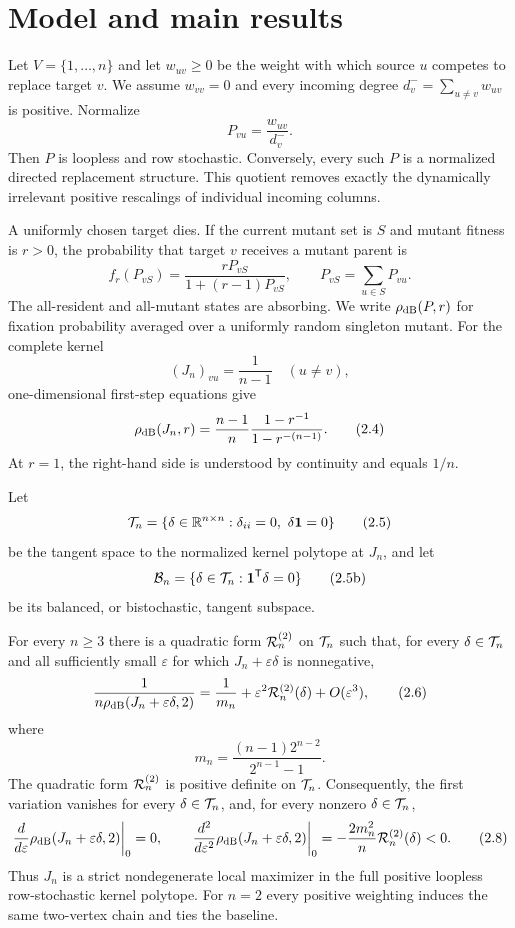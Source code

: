 \section{Model and main results}\label{sec:model-results}

Let $V=\{1,\ldots,n\}$ and let $w_{uv}\ge0$ be the weight with which source
$u$ competes to replace target $v$.  We assume $w_{vv}=0$ and every incoming
degree $d_v^-=\sum_{u\ne v}w_{uv}$ is positive.  Normalize
\[
 P_{vu}=\frac{w_{uv}}{d_v^-}.                              \tag{2.1}\label{2.1}
\]
Then $P$ is loopless and row stochastic.  Conversely, every such $P$ is a
normalized directed replacement structure.  This quotient removes exactly
the dynamically irrelevant positive rescalings of individual incoming
columns.

A uniformly chosen target dies.  If the current mutant set is $S$ and mutant
fitness is $r>0$, the probability that target $v$ receives a mutant parent is
\[
 f_r(P_{vS})=\frac{rP_{vS}}{1+(r-1)P_{vS}},
 \qquad P_{vS}=\sum_{u\in S}P_{vu}.                         \tag{2.2}\label{2.2}
\]
The all-resident and all-mutant states are absorbing.  We write
$\rho_{\mathrm{dB}}(P,r)$ for fixation probability averaged over a uniformly random
singleton mutant.  For the complete kernel
\[
 (J_n)_{vu}=\frac1{n-1}\quad(u\ne v),                       \tag{2.3}\label{2.3}
\]
one-dimensional first-step equations give
\[
 \rho_{\mathrm{dB}}(J_n,r)
 =\frac{n-1}{n}\frac{1-r^{-1}}{1-r^{-(n-1)}}.               \tag{2.4}\label{2.4}
\]
At $r=1$, the right-hand side is understood by continuity and equals $1/n$.

Let
\[
 \calT_n=\{\delta\in\mathbb R^{n\times n}:
     \delta_{ii}=0,\ \delta\one=0\}                       \tag{2.5}\label{2.5}
\]
be the tangent space to the normalized kernel polytope at $J_n$, and let
\[
 \mathcal B_n=\{\delta\in\mathcal T_n:\mathbf 1^{\mathsf T}\delta=0\}       \tag{2.5b}\label{2.5b}
\]
be its balanced, or bistochastic, tangent subspace.

\begin{theorem}
\label{thm:local}
For every $n\ge3$ there is a quadratic form $\mathcal R^{(2)}_{n}$ on $\mathcal T_n$ such
that, for every $\delta\in\mathcal T_n$ and all sufficiently small
$\varepsilon$ for which $J_n+\varepsilon\delta$ is nonnegative,
\[
 \frac1{n\rho_{\mathrm{dB}}(J_n+\varepsilon\delta,2)}
 =\frac1{m_n}+\varepsilon^2\mathcal R^{(2)}_{n}(\delta)
   +O(\varepsilon^3),                                      \tag{2.6}\label{2.6}
\]
where
\[
 m_n=\frac{(n-1)2^{n-2}}{2^{n-1}-1}.                       \tag{2.7}\label{2.7}
\]
The quadratic form $\mathcal R^{(2)}_n$ is positive definite on $\mathcal T_n$.
Consequently, the first variation vanishes for every $\delta\in\mathcal T_n$,
and, for every nonzero $\delta\in\mathcal T_n$,
\[
 \left.\frac{d}{d\varepsilon}\rho_{\mathrm{dB}}
 (J_n+\varepsilon\delta,2)\right|_{0}=0,
 \qquad
 \left.\frac{d^2}{d\varepsilon^2}\rho_{\mathrm{dB}}
 (J_n+\varepsilon\delta,2)\right|_{0}
 =-\frac{2m_n^2}{n}\mathcal R^{(2)}_{n}(\delta)<0.                    \tag{2.8}\label{2.8}
\]
Thus $J_n$ is a strict nondegenerate local maximizer in the full positive
loopless row-stochastic kernel polytope.  For $n=2$ every positive weighting
induces the same two-vertex chain and ties the baseline.
\end{theorem}

